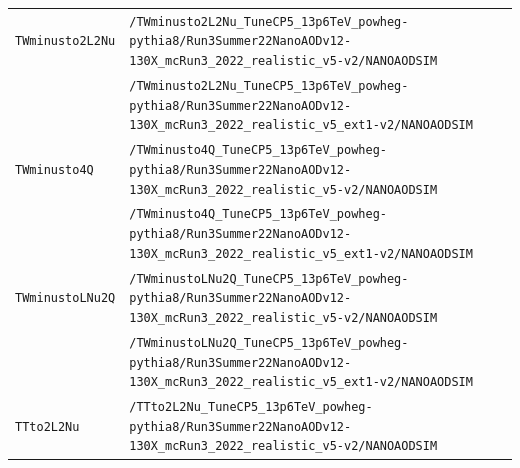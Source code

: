 \begin{longtable}{@{}>{\RaggedRight\arraybackslash}p{} >{\RaggedRight\arraybackslash}p{}@{}}
\addlinespace[2pt]
\texttt{TWminusto2L2Nu} & \texttt{/\allowbreak{}TWminusto2L2Nu\_\allowbreak{}TuneCP5\_\allowbreak{}13p6TeV\_\allowbreak{}powheg-\allowbreak{}pythia8/\allowbreak{}Run3Summer22NanoAODv12-\allowbreak{}130X\_\allowbreak{}mcRun3\_\allowbreak{}2022\_\allowbreak{}realistic\_\allowbreak{}v5-\allowbreak{}v2/\allowbreak{}NANOAODSIM} \\
 & \texttt{/\allowbreak{}TWminusto2L2Nu\_\allowbreak{}TuneCP5\_\allowbreak{}13p6TeV\_\allowbreak{}powheg-\allowbreak{}pythia8/\allowbreak{}Run3Summer22NanoAODv12-\allowbreak{}130X\_\allowbreak{}mcRun3\_\allowbreak{}2022\_\allowbreak{}realistic\_\allowbreak{}v5\_\allowbreak{}ext1-\allowbreak{}v2/\allowbreak{}NANOAODSIM} \\
\addlinespace[2pt]
\texttt{TWminusto4Q} & \texttt{/\allowbreak{}TWminusto4Q\_\allowbreak{}TuneCP5\_\allowbreak{}13p6TeV\_\allowbreak{}powheg-\allowbreak{}pythia8/\allowbreak{}Run3Summer22NanoAODv12-\allowbreak{}130X\_\allowbreak{}mcRun3\_\allowbreak{}2022\_\allowbreak{}realistic\_\allowbreak{}v5-\allowbreak{}v2/\allowbreak{}NANOAODSIM} \\
 & \texttt{/\allowbreak{}TWminusto4Q\_\allowbreak{}TuneCP5\_\allowbreak{}13p6TeV\_\allowbreak{}powheg-\allowbreak{}pythia8/\allowbreak{}Run3Summer22NanoAODv12-\allowbreak{}130X\_\allowbreak{}mcRun3\_\allowbreak{}2022\_\allowbreak{}realistic\_\allowbreak{}v5\_\allowbreak{}ext1-\allowbreak{}v2/\allowbreak{}NANOAODSIM} \\
\addlinespace[2pt]
\texttt{TWminustoLNu2Q} & \texttt{/\allowbreak{}TWminustoLNu2Q\_\allowbreak{}TuneCP5\_\allowbreak{}13p6TeV\_\allowbreak{}powheg-\allowbreak{}pythia8/\allowbreak{}Run3Summer22NanoAODv12-\allowbreak{}130X\_\allowbreak{}mcRun3\_\allowbreak{}2022\_\allowbreak{}realistic\_\allowbreak{}v5-\allowbreak{}v2/\allowbreak{}NANOAODSIM} \\
 & \texttt{/\allowbreak{}TWminustoLNu2Q\_\allowbreak{}TuneCP5\_\allowbreak{}13p6TeV\_\allowbreak{}powheg-\allowbreak{}pythia8/\allowbreak{}Run3Summer22NanoAODv12-\allowbreak{}130X\_\allowbreak{}mcRun3\_\allowbreak{}2022\_\allowbreak{}realistic\_\allowbreak{}v5\_\allowbreak{}ext1-\allowbreak{}v2/\allowbreak{}NANOAODSIM} \\
\addlinespace[2pt]
\texttt{TTto2L2Nu} & \texttt{/\allowbreak{}TTto2L2Nu\_\allowbreak{}TuneCP5\_\allowbreak{}13p6TeV\_\allowbreak{}powheg-\allowbreak{}pythia8/\allowbreak{}Run3Summer22NanoAODv12-\allowbreak{}130X\_\allowbreak{}mcRun3\_\allowbreak{}2022\_\allowbreak{}realistic\_\allowbreak{}v5-\allowbreak{}v2/\allowbreak{}NANOAODSIM} \\

\end{longtable}
